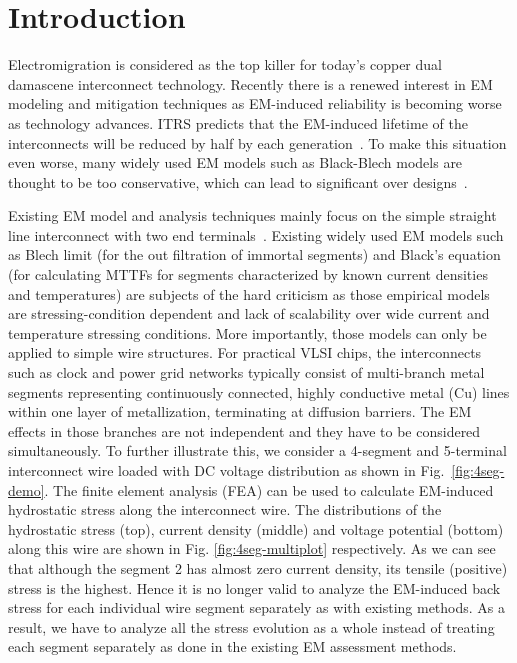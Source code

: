 \section{Introduction}
\label{sec:intro}

Electromigration is considered as the top killer for today's copper
dual damascene interconnect technology. Recently there is a renewed
interest in EM modeling and mitigation techniques as EM-induced
reliability is becoming worse as technology advances.  ITRS predicts
that the EM-induced lifetime of the interconnects will be reduced by
half by each generation~\cite{ITRS}. To make this situation even
worse, many widely used EM models such as Black-Blech models are
thought to be too conservative, which can lead to significant over
designs~\cite{Bailey:semieng}.

Existing EM model and analysis techniques mainly focus on the simple
straight line interconnect with two end terminals~\cite{deOrio:2010}.
Existing widely used EM models such as Blech limit \cite{Blech:1976ko}
(for the out filtration of immortal segments) and Black's equation
\cite{Black:1969fc} (for calculating MTTFs for segments characterized
by known current densities and temperatures) are subjects of the hard
criticism
\cite{Ohring:1998uj}\cite{Lloyd:2008je}\cite{Hauschildt:2013cv} as
those empirical models are stressing-condition dependent and lack of
scalability over wide current and temperature stressing
conditions. More importantly, those models can only be applied to
simple wire structures.  For practical VLSI chips, the interconnects
such as clock and power grid networks typically consist of
multi-branch metal segments representing continuously connected,
highly conductive metal (Cu) lines within one layer of metallization,
terminating at diffusion barriers. The EM effects in those branches
are not independent and they have to be considered simultaneously.  To
further illustrate this, we consider a 4-segment and 5-terminal
interconnect wire loaded with DC voltage distribution as shown in
Fig.~\ref{fig:4seg-demo}. The finite element analysis (FEA) can be
used to calculate EM-induced hydrostatic stress along the interconnect
wire.  The distributions of the hydrostatic stress (top), current
density (middle) and voltage potential (bottom) along this wire are
shown in Fig. \ref{fig:4seg-multiplot} respectively. As we can see
that although the segment 2 has almost zero current density, its
tensile (positive) stress is the highest. Hence it is no longer valid
to analyze the EM-induced back stress for each individual wire segment
separately as with existing methods. As a result, we have to analyze
all the stress evolution as a whole instead of treating each segment
separately as done in the existing EM assessment methods.

